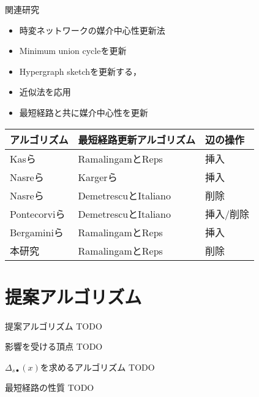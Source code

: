 \documentclass[dvipdfmx,fleqn]{beamer}
\begin{document}
\begin{frame}{関連研究}
  \begin{itemize}
  \item 時変ネットワークの媒介中心性更新法
  \item Minimum union cycleを更新\cite{19Lee2012,20Singh2015}
  \item Hypergraph sketch\cite{17Yoshida2014}を更新する\cite{21Hayashi2015}，
  \item 近似法を応用\cite{22Bergamini2015a,23Bergamini2015b}
  \item \alert{最短経路と共に媒介中心性を更新}
  \end{itemize}
  \centering
  \begin{tabular}{lll}
    \hline
    アルゴリズム & 最短経路更新アルゴリズム & 辺の操作 \\ \hline
    Kasら\cite{25Kas2013} & RamalingamとReps\cite{24Ramalingam1996} & 挿入 \\ \hline
    Nasreら\cite{27Nasre2014a} & Kargerら\cite{26Karger1993} & 挿入 \\ \hline
    Nasreら\cite{29Nasre2014b} & DemetrescuとItaliano\cite{28Demetrescu2003} & 削除 \\ \hline
    Pontecorviら\cite{30Pontecorvi2015} & DemetrescuとItaliano\cite{28Demetrescu2003} & 挿入/削除 \\ \hline
    Bergaminiら\cite{31Bergamini2017} & RamalingamとReps\cite{24Ramalingam1996} & 挿入 \\ \hline
    \alert{本研究} & \alert{RamalingamとReps}\cite{24Ramalingam1996} & \alert{削除} \\ \hline
  \end{tabular}
\end{frame}

\section{提案アルゴリズム}
\begin{frame}{提案アルゴリズム}
  \alert{TODO}
\end{frame}

\begin{frame}{影響を受ける頂点}
  \alert{TODO}
\end{frame}

\begin{frame}{$\Delta_{s\bullet}(x)$を求めるアルゴリズム}
  \alert{TODO}
\end{frame}

\begin{frame}{最短経路の性質}
  \alert{TODO}
\end{frame}
\end{document}
